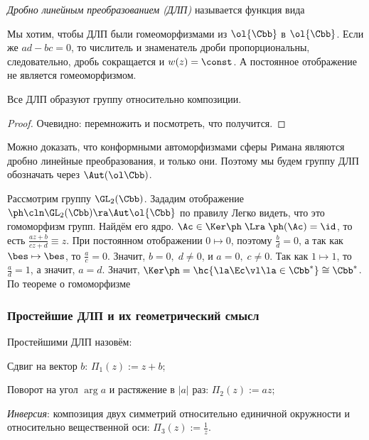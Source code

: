 \documentclass[a4paper]{article}
\begin{document}
\begin{df} \emph{Дробно линейным преобразованием (ДЛП)} называется функция
вида
\end{df}

\begin{note}
Мы хотим, чтобы ДЛП были гомеоморфизмами из $\ol{\Cbb}$ в $\ol{\Cbb}$. Если же $ad - bc = 0$, то числитель и
знаменатель дроби пропорциональны, следовательно, дробь сокращается и $w(z) = \const$. А постоянное отображение
не является гомеоморфизмом.
\end{note}

\begin{theorem}
Все ДЛП образуют группу относительно композиции.
\end{theorem}
\begin{proof}
Очевидно: перемножить и посмотреть, что получится.
\end{proof}

Можно доказать, что конформными автоморфизмами сферы Римана являются дробно линейные преобразования, и только они.
Поэтому мы будем группу ДЛП обозначать через $\Aut(\ol\Cbb)$.

Рассмотрим группу $\GL_2(\Cbb)$. Зададим отображение $\ph\cln \GL_2(\Cbb) \ra \Aut \ol{\Cbb}$ по правилу
 Легко видеть, что это гомоморфизм групп.
Найдём его ядро. $\Ac \in \Ker \ph \; \Lra \; \ph(\Ac) = \id$, то есть $\frac{az + b}{cz + d} \equiv z$.
При постоянном отображении $0 \mapsto 0$, поэтому $\frac{b}{d} = 0$, а так как $\bes \mapsto \bes$,
то $\frac{a}{c} = 0$. Значит, $b = 0, \; d \neq 0$, и $a = 0, \; c \neq 0$. Так
как $1 \mapsto 1$, то $\frac{a}{d}=1$, а значит, $a=d$.
Значит, $\Ker \ph = \hc{\la \Ec \vl \la \in \Cbb^*} \cong \Cbb^*$. По теореме о гомоморфизме

\subsubsection{Простейшие ДЛП и их геометрический смысл}

\begin{df}
Простейшими ДЛП назовём:
\begin{nums}{-2}
\item Сдвиг на вектор $b$: $\Pi_1(z) := z + b$;
\item Поворот на угол $\arg a$ и растяжение в $|a|$ раз: $\Pi_2(z) := az$;
\item \emph{Инверсия}: композиция двух симметрий относительно единичной окружности и относительно вещественной оси:
$\Pi_3(z) := \frac{1}{z}$.
\end{nums}
\end{df}
\end{document}
